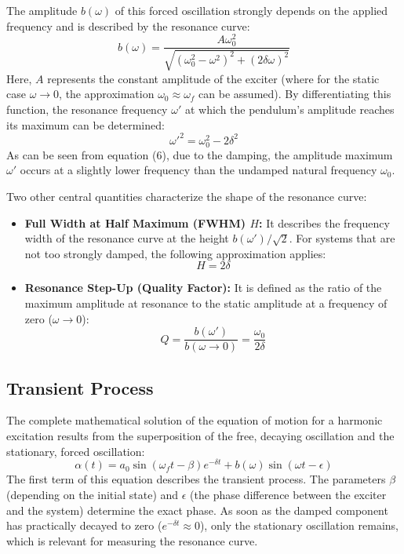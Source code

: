\documentclass[12pt,a4paper,titlepage]{scrartcl}
\numberwithin{equation}{section}
\numberwithin{table}{section}
\numberwithin{figure}{section}
\begin{document}
The amplitude $b(\omega)$ of this forced oscillation strongly depends on the applied frequency and is described by the resonance curve:
\begin{equation}
    b(\omega) = \frac{A \omega_0^2}{\sqrt{(\omega_0^2 - \omega^2)^2 + (2\delta\omega)^2}}
\end{equation}
Here, $A$ represents the constant amplitude of the exciter (where for the static case $\omega \rightarrow 0$, the approximation $\omega_0 \approx \omega_f$ can be assumed). By differentiating this function, the resonance frequency $\omega'$ at which the pendulum's amplitude reaches its maximum can be determined:
\begin{equation}
    \omega'^2 = \omega_0^2 - 2\delta^2
\end{equation}
As can be seen from equation (6), due to the damping, the amplitude maximum $\omega'$ occurs at a slightly lower frequency than the undamped natural frequency $\omega_0$. 

Two other central quantities characterize the shape of the resonance curve:
\begin{itemize}
    \item \textbf{Full Width at Half Maximum (FWHM) $H$:} It describes the frequency width of the resonance curve at the height $b(\omega')/\sqrt{2}$. For systems that are not too strongly damped, the following approximation applies:
    \begin{equation}
        H = 2\delta \label{eq:FWHM}
    \end{equation}
    
    \item \textbf{Resonance Step-Up (Quality Factor):} It is defined as the ratio of the maximum amplitude at resonance to the static amplitude at a frequency of zero ($\omega \rightarrow 0$):
    \begin{equation}
        Q = \frac{b(\omega')}{b(\omega \rightarrow 0)} = \frac{\omega_0}{2\delta} \label{eq:Quality-factor}
    \end{equation}
\end{itemize}

\subsection{Transient Process}
The complete mathematical solution of the equation of motion for a harmonic excitation results from the superposition of the free, decaying oscillation and the stationary, forced oscillation:
\begin{equation}
    \alpha(t) = a_0 \sin(\omega_f t - \beta) e^{-\delta t} + b(\omega) \sin(\omega t - \epsilon)
\end{equation}
The first term of this equation describes the transient process. The parameters $\beta$ (depending on the initial state) and $\epsilon$ (the phase difference between the exciter and the system) determine the exact phase. As soon as the damped component has practically decayed to zero ($e^{-\delta t} \approx 0$), only the stationary oscillation remains, which is relevant for measuring the resonance curve.
\end{document}
